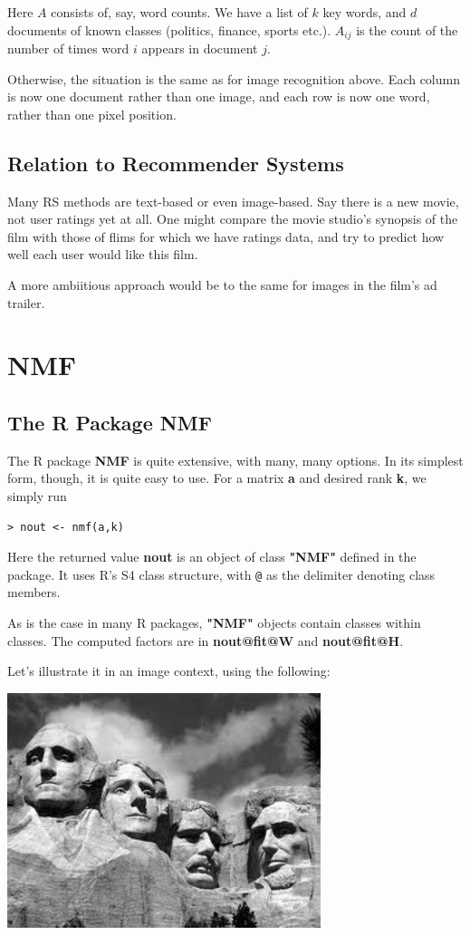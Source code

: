 Here $A$ consists of, say, word counts. We have a list of $k$ key words,
and $d$ documents of known classes (politics, finance, sports etc.).
$A_{ij}$ is the count of the number of times word $i$ appears in
document $j$.

Otherwise, the situation is the same as for image recognition above.
Each column is now one document rather than one image, and each row is
now one word, rather than one pixel position.

\subsection{Relation to Recommender Systems}

Many RS methods are text-based or even image-based.  Say there is a new
movie, not user ratings yet at all.  One might compare the movie
studio's synopsis of the film with those of flims for which we have
ratings data, and try to predict how well each user would like this
film.

A more ambiitious approach would be to the same for images in the film's
ad trailer.

\section{NMF}

\subsection{The R Package NMF}

The R package {\bf NMF} is quite extensive, with many, many options.  In
its simplest form, though, it is quite easy to use.  For a matrix {\bf
a} and desired rank {\bf k}, we simply run

\begin{lstlisting}
> nout <- nmf(a,k)
\end{lstlisting}

Here the returned value {\bf nout} is an object of class {\bf "NMF"}
defined in the package.  It uses R's S4 class structure, with
\lstinline{@} as the delimiter denoting class members.  

As is the case in many R packages, {\bf "NMF"} objects contain classes
within classes.  The computed factors are in {\bf nout@fit@W} and {\bf
nout@fit@H}.

Let's illustrate it in an image context, using the following:

\includegraphics[width=3.6in]{Images/MtRush.png}

